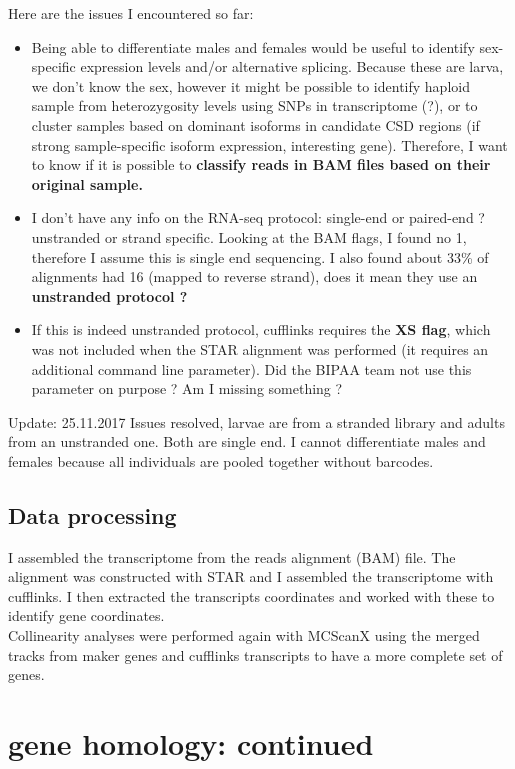 \documentclass[10pt,a4paper]{report}
\begin{document}
\begin{itemize}
Here are the issues I encountered so far:
\begin{itemize}
\item Being able to differentiate males and females would be useful to identify sex-specific expression levels and/or alternative splicing. Because these are larva, we don't know the sex, however it might be possible to identify haploid sample from heterozygosity levels using SNPs in transcriptome (?), or to cluster samples based on dominant isoforms in candidate CSD regions (if strong sample-specific isoform expression, interesting gene). Therefore, I want to know if it is possible to \textbf{classify reads in BAM files based on their original sample.}
\item I don't have any info on the RNA-seq protocol: single-end or paired-end ? unstranded or strand specific. Looking at the BAM flags, I found no 1, therefore I assume this is single end sequencing. I also found about 33\% of alignments had 16 (mapped to reverse strand), does it mean they use an \textbf{unstranded protocol ?}
\item If this is indeed unstranded protocol, cufflinks requires the \textbf{XS flag}, which was not included when the  STAR alignment was performed (it requires an additional  command line parameter). Did the BIPAA team not use this parameter on purpose ? Am I missing something ?

\end{itemize}
\end{itemize}
\FloatBarrier
Update: 25.11.2017
Issues resolved, larvae are from a stranded library and adults from an unstranded one. Both are single end. I cannot differentiate males and females because all individuals are pooled together without barcodes.

\subsection{Data processing}

I assembled the transcriptome from the reads alignment (BAM) file. The alignment was constructed with STAR and I assembled the transcriptome with cufflinks. I then extracted the transcripts coordinates and worked with these to identify gene coordinates.\\
Collinearity analyses were performed again with MCScanX using the merged tracks from maker genes and cufflinks transcripts to have a more complete set of genes.

\section{gene homology: continued}
\end{document}
